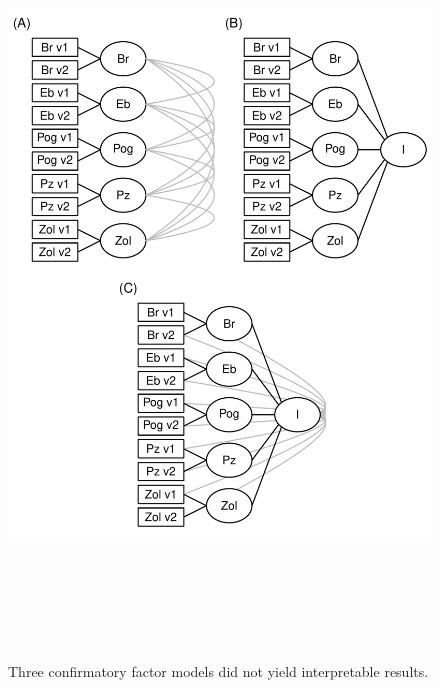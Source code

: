 \documentclass[man, 12pt]{apa7} %
\begin{document}
\begin{figure}
    \centering  %
    \includegraphics[width=6in, height=8in]{_figs/factor_cfa.pdf}
    \caption{Three confirmatory factor models did not yield interpretable results.}
    \label{fig:cfa}
\end{figure}
\end{document}
